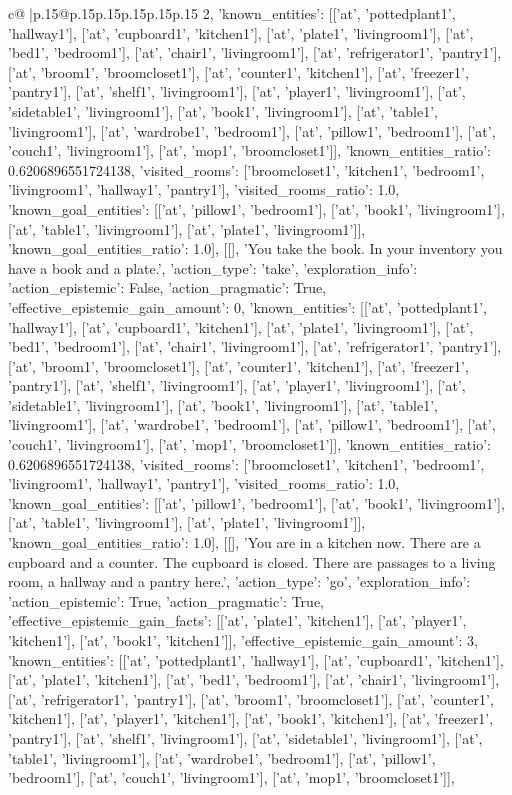 \documentclass{article}
\begin{document}
{\begin{supertabular}{c@{$\;$}|p{.15\linewidth}@{}p{.15\linewidth}p{.15\linewidth}p{.15\linewidth}p{.15\linewidth}p{.15\linewidth}}
{{{2, 'known_entities': [['at', 'pottedplant1', 'hallway1'], ['at', 'cupboard1', 'kitchen1'], ['at', 'plate1', 'livingroom1'], ['at', 'bed1', 'bedroom1'], ['at', 'chair1', 'livingroom1'], ['at', 'refrigerator1', 'pantry1'], ['at', 'broom1', 'broomcloset1'], ['at', 'counter1', 'kitchen1'], ['at', 'freezer1', 'pantry1'], ['at', 'shelf1', 'livingroom1'], ['at', 'player1', 'livingroom1'], ['at', 'sidetable1', 'livingroom1'], ['at', 'book1', 'livingroom1'], ['at', 'table1', 'livingroom1'], ['at', 'wardrobe1', 'bedroom1'], ['at', 'pillow1', 'bedroom1'], ['at', 'couch1', 'livingroom1'], ['at', 'mop1', 'broomcloset1']], 'known_entities_ratio': 0.6206896551724138, 'visited_rooms': ['broomcloset1', 'kitchen1', 'bedroom1', 'livingroom1', 'hallway1', 'pantry1'], 'visited_rooms_ratio': 1.0, 'known_goal_entities': [['at', 'pillow1', 'bedroom1'], ['at', 'book1', 'livingroom1'], ['at', 'table1', 'livingroom1'], ['at', 'plate1', 'livingroom1']], 'known_goal_entities_ratio': 1.0}}], [[], 'You take the book. In your inventory you have a book and a plate.', {'action_type': 'take', 'exploration_info': {'action_epistemic': False, 'action_pragmatic': True, 'effective_epistemic_gain_amount': 0, 'known_entities': [['at', 'pottedplant1', 'hallway1'], ['at', 'cupboard1', 'kitchen1'], ['at', 'plate1', 'livingroom1'], ['at', 'bed1', 'bedroom1'], ['at', 'chair1', 'livingroom1'], ['at', 'refrigerator1', 'pantry1'], ['at', 'broom1', 'broomcloset1'], ['at', 'counter1', 'kitchen1'], ['at', 'freezer1', 'pantry1'], ['at', 'shelf1', 'livingroom1'], ['at', 'player1', 'livingroom1'], ['at', 'sidetable1', 'livingroom1'], ['at', 'book1', 'livingroom1'], ['at', 'table1', 'livingroom1'], ['at', 'wardrobe1', 'bedroom1'], ['at', 'pillow1', 'bedroom1'], ['at', 'couch1', 'livingroom1'], ['at', 'mop1', 'broomcloset1']], 'known_entities_ratio': 0.6206896551724138, 'visited_rooms': ['broomcloset1', 'kitchen1', 'bedroom1', 'livingroom1', 'hallway1', 'pantry1'], 'visited_rooms_ratio': 1.0, 'known_goal_entities': [['at', 'pillow1', 'bedroom1'], ['at', 'book1', 'livingroom1'], ['at', 'table1', 'livingroom1'], ['at', 'plate1', 'livingroom1']], 'known_goal_entities_ratio': 1.0}}], [[], 'You are in a kitchen now. There are a cupboard and a counter. The cupboard is closed. There are passages to a living room, a hallway and a pantry here.', {'action_type': 'go', 'exploration_info': {'action_epistemic': True, 'action_pragmatic': True, 'effective_epistemic_gain_facts': [['at', 'plate1', 'kitchen1'], ['at', 'player1', 'kitchen1'], ['at', 'book1', 'kitchen1']], 'effective_epistemic_gain_amount': 3, 'known_entities': [['at', 'pottedplant1', 'hallway1'], ['at', 'cupboard1', 'kitchen1'], ['at', 'plate1', 'kitchen1'], ['at', 'bed1', 'bedroom1'], ['at', 'chair1', 'livingroom1'], ['at', 'refrigerator1', 'pantry1'], ['at', 'broom1', 'broomcloset1'], ['at', 'counter1', 'kitchen1'], ['at', 'player1', 'kitchen1'], ['at', 'book1', 'kitchen1'], ['at', 'freezer1', 'pantry1'], ['at', 'shelf1', 'livingroom1'], ['at', 'sidetable1', 'livingroom1'], ['at', 'table1', 'livingroom1'], ['at', 'wardrobe1', 'bedroom1'], ['at', 'pillow1', 'bedroom1'], ['at', 'couch1', 'livingroom1'], ['at', 'mop1', 'broomcloset1']], }}}
\end{supertabular}}
\end{document}
